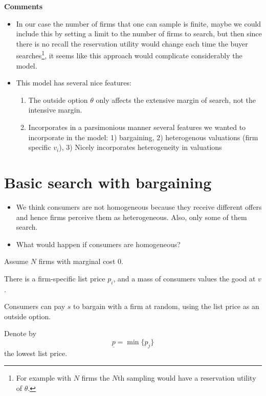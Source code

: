 \documentclass[12pt]{article}
\theoremstyle{plain}
\theoremstyle{plain}
\begin{document}
\textbf{Comments} 
\begin{itemize}
    \item In our case the number of firms that one can sample is finite, maybe we could include this by setting a limit to the number of firms to search, but then since there is no recall the reservation utility would change each time the buyer searches\footnote{For example with $N$ firms the $N$th sampling would have a reservation utility of $\theta$.}, it seems like this approach would complicate considerably the model. 

    \item This model has several nice features: 
    \begin{enumerate}
        \item The outside option $\theta$ only affects the extensive margin of search, not the intensive margin. 
        \item Incorporates in a parsimonious manner several features we wanted to incorporate in the model: 1) bargaining, 2) heterogenous valuations (firm specific $v_i$), 3) Nicely incorporates heterogeneity in valuations  
    \end{enumerate}
\end{itemize}



\section{Basic search with bargaining}\label{sec:basic1}

\begin{itemize}
    \item We think consumers are not homogeneous because they receive different offers and hence firms perceive them as heterogeneous. Also, only some of them search.
    \item What would happen if consumers are homogeneous?
\end{itemize}

Assume $N$ firms with marginal cost $0$.

There is a firm-specific list price $p_i$, and a mass of consumers values the good at $v$.

Consumers can pay $s$ to bargain with a firm at random, using the list price as an outside option.


Denote by
\[
\underline{p} = \min\{p_j\}
\]
the lowest list price.
\end{document}
